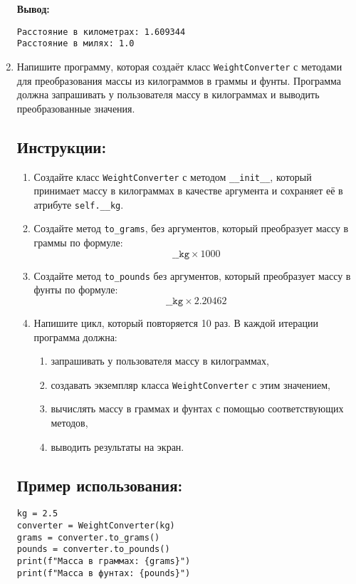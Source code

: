 \begin{enumerate}
\textbf{Вывод:}
\begin{verbatim}
Расстояние в километрах: 1.609344
Расстояние в милях: 1.0
\end{verbatim}

\item
Напишите программу, которая создаёт класс \texttt{WeightConverter} с методами для преобразования массы
из килограммов в граммы и фунты. Программа должна запрашивать у пользователя массу в килограммах
и выводить преобразованные значения.

\subsection*{Инструкции:}
\begin{enumerate}
\item Создайте класс \texttt{WeightConverter} с методом
\texttt{\_\_init\_\_}, который принимает массу в килограммах в
качестве аргумента и сохраняет её в атрибуте \texttt{self.\_\_kg}.

\item Создайте метод \texttt{to\_grams},
без аргументов, который преобразует массу в граммы по формуле:
\[
\texttt{\_\_kg} \times 1000
\]

\item Создайте метод \texttt{to\_pounds} без аргументов,
который преобразует массу в фунты по формуле:
\[
\texttt{\_\_kg} \times 2.20462
\]

\item Напишите цикл, который повторяется 10 раз. В каждой итерации программа должна:
\begin{enumerate}
\item запрашивать у пользователя массу в килограммах,
\item создавать экземпляр класса \texttt{WeightConverter} с этим значением,
\item вычислять массу в граммах и фунтах с помощью соответствующих методов,
\item выводить результаты на экран.
\end{enumerate}
\end{enumerate}

\subsection*{Пример использования:}
\begin{verbatim}
kg = 2.5
converter = WeightConverter(kg)
grams = converter.to_grams()
pounds = converter.to_pounds()
print(f"Масса в граммах: {grams}")
print(f"Масса в фунтах: {pounds}")
\end{verbatim}


\end{enumerate}

